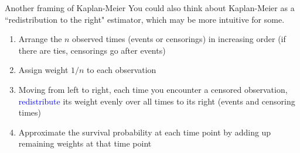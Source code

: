 \documentclass[10pt,t]{beamer}
\begin{document}
\begin{frame}{Another framing of Kaplan-Meier}
	You could also think about Kaplan-Meier as a ``redistribution to the right" estimator, which may be more intuitive for some.
	
	\medskip 
	\begin{enumerate}
		\item Arrange the $n$ observed times (events or censorings) in increasing order (if there are ties, censorings go after events)
		
		\medskip
		
		\item Assign weight $1/n$ to each observation
		
		\medskip
		
		\item Moving from left to right, each time you encounter a censored observation, \textcolor{blue}{redistribute} its weight evenly over all times to its right (events and censoring times)
		
		\medskip
		
		\item Approximate the survival probability at each time point by adding up remaining weights at that time point
	\end{enumerate}
\end{frame}
\end{document}
